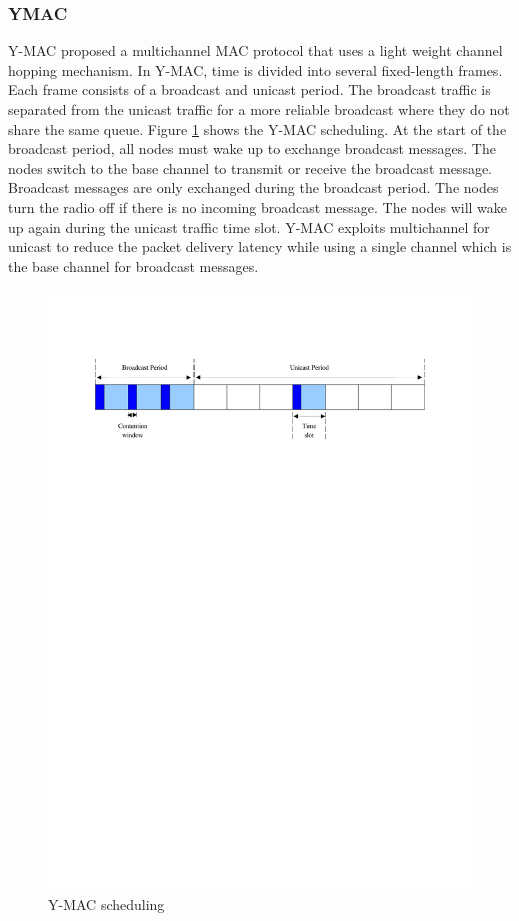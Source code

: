 
\subsubsection{YMAC}
Y-MAC \cite{y-mac} proposed a multichannel MAC protocol that uses a light weight channel hopping mechanism. In Y-MAC, time is divided into several fixed-length frames. Each frame consists of a broadcast and unicast period. The broadcast traffic is separated from the unicast traffic for a more reliable broadcast where they do not share the same queue. Figure \ref{fig_ymac} shows the Y-MAC scheduling. At the start of the broadcast period, all nodes must wake up to exchange broadcast messages. The nodes switch to the base channel to transmit or receive the broadcast message. Broadcast messages are only exchanged during the broadcast period. The nodes turn the radio off if there is no incoming broadcast message. The nodes will wake up again during the unicast traffic time slot. Y-MAC exploits multichannel for unicast to reduce the packet delivery latency while using a single channel which is the base channel for broadcast messages.

\begin{figure}
\centering
\includegraphics[trim=2cm 22cm 2cm 3cm, clip=true, totalheight=0.17\textheight]{ymac.pdf}
\caption{Y-MAC scheduling}
\label{fig_ymac}
\end{figure}

